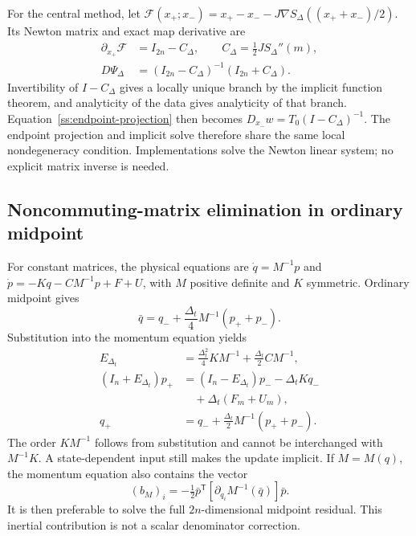 For the central method, let
$\mathcal F(x_+;x_-)=x_+-x_--J\nabla S_\Delta((x_++x_-)/2)$.
Its Newton matrix and exact map derivative are
\begin{equation}\label{ss:newton-matrix}
\begin{aligned}
 \partial_{x_+}\mathcal F&=I_{2n}-C_\Delta,\qquad
 C_\Delta=\tfrac12J S_\Delta''(m),\\
 D\Psi_\Delta&=(I_{2n}-C_\Delta)^{-1}(I_{2n}+C_\Delta).
\end{aligned}
\end{equation}
Invertibility of $I-C_\Delta$ gives a locally unique branch by the implicit function theorem, and analyticity of the data gives analyticity of that branch. Equation~\eqref{ss:endpoint-projection} then becomes
$D_{x_-}w=T_0(I-C_\Delta)^{-1}$.
The endpoint projection and implicit solve therefore share the same local nondegeneracy condition. Implementations solve the Newton linear system; no explicit matrix inverse is needed.

\subsection{Noncommuting-matrix elimination in ordinary midpoint}
\label{ss:matrix}

For constant matrices, the physical equations are
$\dot q=M^{-1}p$ and
$\dot p=-Kq-CM^{-1}p+F+U$, with $M$ positive definite and $K$ symmetric. Ordinary midpoint gives
\[
 \bar q=q_-+\frac{\Delta_t}{4}M^{-1}(p_++p_-).
\]
Substitution into the momentum equation yields
\begin{equation}\label{ss:matrix-elimination}
\begin{aligned}
 E_{\Delta_t}&=\tfrac{\Delta_t^2}{4}KM^{-1}
                            +\tfrac{\Delta_t}{2}CM^{-1},\\
 (I_n+E_{\Delta_t})p_+
   &=(I_n-E_{\Delta_t})p_--\Delta_tKq_-\\
   &\quad+\Delta_t(F_m+U_m),\\
 q_+&=q_-+\tfrac{\Delta_t}{2}M^{-1}(p_++p_-).
\end{aligned}
\end{equation}
The order $KM^{-1}$ follows from substitution and cannot be interchanged with $M^{-1}K$. A state-dependent input still makes the update implicit. If $M=M(q)$, the momentum equation also contains the vector
\[
 (b_M)_i=-\tfrac12\bar p^{\mathsf T}
       [\partial_{q_i}M^{-1}(\bar q)]\bar p.
\]
It is then preferable to solve the full $2n$-dimensional midpoint residual. This inertial contribution is not a scalar denominator correction.

